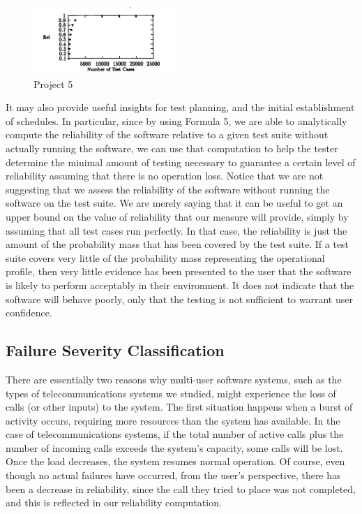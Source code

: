 \documentclass[journal, twoside]{IEEEtran}
\begin{document}
\begin{figure}[ht]
    \centering
    \includegraphics[width=0.48\textwidth, height= 0.2\textwidth]{figure5.PNG}
    \caption{ Project 5}
\end{figure}
It may also provide useful insights for test planning, and the initial establishment of schedules. In particular, since by using Formula 5, we are able to analytically compute the reliability
of the software relative to a given test suite without actually
running the software, we can use that computation to help the
tester determine the minimal amount of testing necessary to
guarantee a certain level of reliability assuming that there is no
operation loss. Notice that we are not suggesting that we assess
the reliability of the software without running the software on
the test suite. We are merely saying that it can be useful to get
an upper bound on the value of reliability that our measure will
provide, simply by assuming that all test cases run perfectly. In
that case, the reliability is just the amount of the probability
mass that has been covered by the test suite. If a test suite covers very little of the probability mass representing the operational profile, then very little evidence has been presented to
the user that the software is likely to perform acceptably in
their environment. It does not indicate that the software will
behave poorly, only that the testing is not sufficient to warrant
user confidence.

\subsection{Failure Severity Classification }
There are essentially two reasons why multi-user software
systems, such as the types of telecommunications systems we
studied, might experience the loss of calls (or other inputs) to
the system. The first situation happens when a burst of activity
occurs, requiring more resources than the system has available.
In the case of telecommunications systems, if the total number
of active calls plus the number of incoming calls exceeds the
system's capacity, some calls will be lost. Once the load decreases, the system resumes normal operation. Of course, even
though no actual failures have occurred, from the user's perspective, there has been a decrease in reliability, since the call
they tried to place was not completed, and this is reflected in
our reliability computation. 
\end{document}
